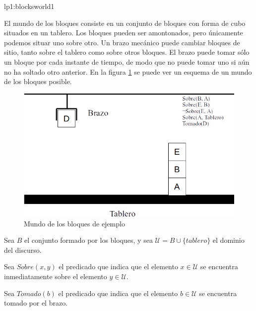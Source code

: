 \begin{defproblem}{lp1:blocksworld1}%
 \begin{onlyproblem}%
	El mundo de los bloques consiste en un conjunto de bloques con forma de cubo situados en un tablero. Los bloques pueden ser amontonados, pero únicamente podemos situar uno sobre otro. Un brazo mecánico puede cambiar bloques de sitio, tanto sobre el tablero como sobre otros bloques. El brazo puede tomar sólo un bloque por cada instante de tiempo, de modo que no puede tomar uno si aún no ha soltado otro anterior. En la figura \ref{fig:ejemplo-bloques1} se puede ver un esquema de un mundo de los bloques posible.
	
	\begin{figure}[b]
		\centering
		\includegraphics[width=0.7\linewidth]{Blocksworld-ejemplo}
		\caption[Mundo de los bloques de ejemplo]{Mundo de los bloques de ejemplo}
		\label{fig:ejemplo-bloques1}
	\end{figure}
	
	Sea $ B $ el conjunto formado por los bloques, y sea $ \mathcal{U} = B \cup \{tablero\} $ el dominio del discurso.
	
	Sea $ Sobre(x, y) $ el predicado que indica que el elemento $ x \in \mathcal{U} $ se encuentra inmediatamente sobre el elemento $ y \in \mathcal{U} $.
	
	Sea $ Tomado(b) $ el predicado que indica que el elemento $ b \in \mathcal{U} $ se encuentra tomado por el brazo.
	

\end{onlyproblem}
\end{defproblem}
